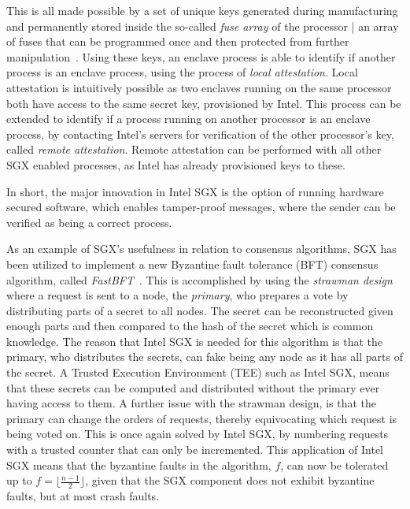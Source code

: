 \documentclass{article}
\begin{document}
		This is all made possible by a set of unique keys generated during manufacturing and permanently stored inside the so-called \textit{fuse array} of the processor | an array of fuses that can be programmed once and then protected from further manipulation~\cite{robson_electrically_2007}.
		Using these keys, an enclave process is able to identify if another process is an enclave process, using the process of \textit{local attestation}.
		Local attestation is intuitively possible as two enclaves running on the same processor both have access to the same secret key, provisioned by Intel.
		This process can be extended to identify if a process running on another processor is an enclave process, by contacting Intel's servers for verification of the other processor's key, called \textit{remote attestation}.
		Remote attestation can be performed with all other SGX enabled processes, as Intel has already provisioned keys to these.

		In short, the major innovation in Intel SGX is the option of running hardware secured software, which enables tamper-proof messages, where the sender can be verified as being a correct process.

		As an example of SGX's usefulness in relation to consensus algorithms, SGX has been utilized to implement a new Byzantine fault tolerance (BFT) consensus algorithm, called \textit{FastBFT}~\cite{liu_scalable_2016}.
		This is accomplished by using the \textit{strawman design} where a request is sent to a node, the \textit{primary}, who prepares a vote by distributing parts of a secret to all nodes.
		The secret can be reconstructed given enough parts and then compared to the hash of the secret which is common knowledge.
		The reason that Intel SGX is needed for this algorithm is that the primary, who distributes the secrets, can fake being any node as it has all parts of the secret.
		A Trusted Execution Environment (TEE) such as Intel SGX, means that these secrets can be computed and distributed without the primary ever having access to them.
		A further issue with the strawman design, is that the primary can change the orders of requests, thereby equivocating which request is being voted on.
		This is once again solved by Intel SGX, by numbering requests with a trusted counter that can only be incremented.
		This application of Intel SGX means that the byzantine faults in the algorithm, $f$, can now be tolerated up to $f = \lfloor\frac{n-1}{2}\rfloor$, given that the SGX component does not exhibit byzantine faults, but at most crash faults.
\end{document}
